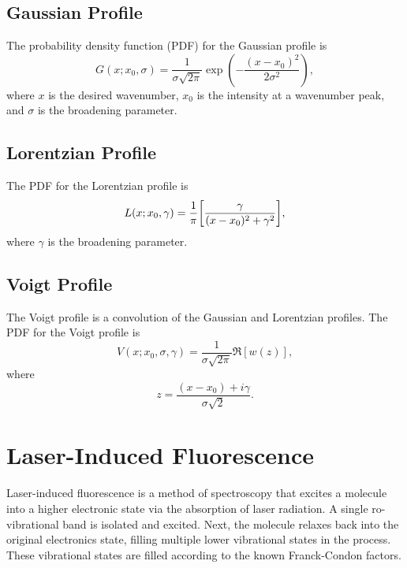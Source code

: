 \documentclass[11pt, twoside, fleqn]{report}
\DeclareRobustCommand\_{\ifmmode\expandafter\subtxt\else\textunderscore\fi}
\DeclarePairedDelimiter\bk{\lbrack}{\rbrack}
\newcommand{\img}{i}
\begin{document}
\section{Gaussian Profile}
\label{s:gaussian_profile}

The probability density function (PDF) for the Gaussian profile is
\begin{equation*}
    G(x; x_0, \sigma) = \frac{1}{\sigma\sqrt{2\pi}}\exp(-\frac{(x - x_0)^2}{2\sigma^2}),
\end{equation*}
where $x$ is the desired wavenumber, $x_0$ is the intensity at a wavenumber peak, and $\sigma$ is the broadening parameter.

\section{Lorentzian Profile}
\label{s:lorentzian_profile}

The PDF for the Lorentzian profile is
\begin{equation*}
    L(x; x_0, \gamma) = \frac{1}{\pi}\bk*{\frac{\gamma}{(x - x_0)^2 + \gamma^2}},
\end{equation*}
where $\gamma$ is the broadening parameter.

\section{Voigt Profile}
\label{s:voigt_profile}

The Voigt profile is a convolution of the Gaussian and Lorentzian profiles. The PDF for the Voigt profile is
\begin{equation*}
    V(x; x_0, \sigma, \gamma) = \frac{1}{\sigma\sqrt{2\pi}}\Re[w(z)],
\end{equation*}
where
\begin{equation*}
    z = \frac{(x - x_0) + \img\gamma}{\sigma\sqrt{2}}.
\end{equation*}

\chapter{Laser-Induced Fluorescence}
\label{c:laser-induced_flourescence}

Laser-induced fluorescence is a method of spectroscopy that excites a molecule into a higher electronic state via the absorption of laser radiation. A single ro-vibrational band is isolated and excited. Next, the molecule relaxes back into the original electronics state, filling multiple lower vibrational states in the process. These vibrational states are filled according to the known Franck-Condon factors.
\end{document}
